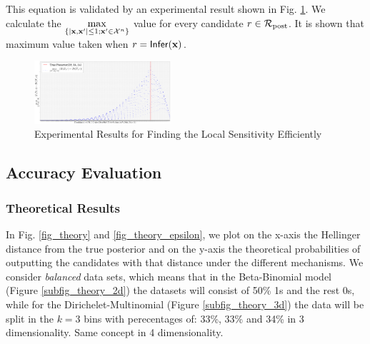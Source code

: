 \documentclass{article}
\begin{document}


This equation is validated by an experimental result shown in Fig. \ref{fig_efficiency}. We calculate the $\max\limits_{\{|\textbf{x},\textbf{x}'| \leq 1;\textbf{x}'\in \mathcal{X}^n\}}$ value for every candidate $r \in \mathcal{R}_{\textup{post}}$. It is shown that maximum value taken when  $r = \mathsf{Infer}(\textbf{x})$.

\begin{figure}[ht]
\centering
\includegraphics[width=0.45\textwidth]{efficiency.eps}
\caption{Experimental Results for Finding the Local Sensitivity Efficiently}
\label{fig_efficiency}
\end{figure}

\subsection{Accuracy Evaluation}
\subsubsection{Theoretical Results}
In Fig. \ref{fig_theory} and \ref{fig_theory_epsilon}, we plot on the x-axis the Hellinger distance from the true posterior and on the y-axis the theoretical probabilities of outputting the candidates with that distance under the different mechanisms. We consider \emph{balanced} data sets, which means that in the Beta-Binomial model (Figure \ref{subfig_theory_2d}) the datasets will consist of 50\% 1s and the rest 0s, while for the
Dirichelet-Multinomial (Figure  \ref{subfig_theory_3d})
the data will be split in the $k=3$ bins with perecentages of: 33\%, 33\% and 34\% in 3 dimensionality. Same concept in 4 dimensionality.
\end{document}
